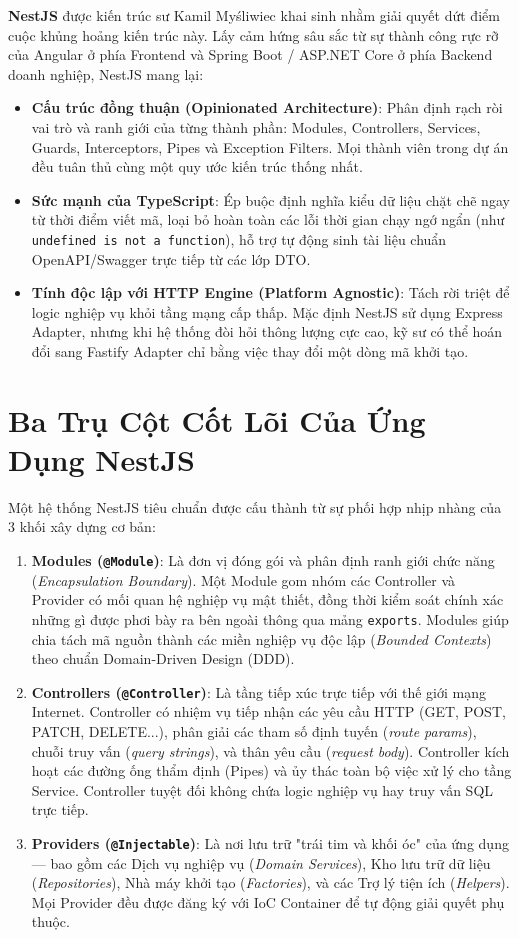 \documentclass[12pt,a4paper,oneside]{book}
\begin{document}
\textbf{NestJS} được kiến trúc sư Kamil Myśliwiec khai sinh nhằm giải quyết dứt điểm cuộc khủng hoảng kiến trúc này. Lấy cảm hứng sâu sắc từ sự thành công rực rỡ của Angular ở phía Frontend và Spring Boot / ASP.NET Core ở phía Backend doanh nghiệp, NestJS mang lại:
\begin{itemize}
  \item \textbf{Cấu trúc đồng thuận (Opinionated Architecture)}: Phân định rạch ròi vai trò và ranh giới của từng thành phần: Modules, Controllers, Services, Guards, Interceptors, Pipes và Exception Filters. Mọi thành viên trong dự án đều tuân thủ cùng một quy ước kiến trúc thống nhất.
  \item \textbf{Sức mạnh của TypeScript}: Ép buộc định nghĩa kiểu dữ liệu chặt chẽ ngay từ thời điểm viết mã, loại bỏ hoàn toàn các lỗi thời gian chạy ngớ ngẩn (như \texttt{undefined is not a function}), hỗ trợ tự động sinh tài liệu chuẩn OpenAPI/Swagger trực tiếp từ các lớp DTO.
  \item \textbf{Tính độc lập với HTTP Engine (Platform Agnostic)}: Tách rời triệt để logic nghiệp vụ khỏi tầng mạng cấp thấp. Mặc định NestJS sử dụng Express Adapter, nhưng khi hệ thống đòi hỏi thông lượng cực cao, kỹ sư có thể hoán đổi sang Fastify Adapter chỉ bằng việc thay đổi một dòng mã khởi tạo.
\end{itemize}

\section{Ba Trụ Cột Cốt Lõi Của Ứng Dụng NestJS}
Một hệ thống NestJS tiêu chuẩn được cấu thành từ sự phối hợp nhịp nhàng của 3 khối xây dựng cơ bản:
\begin{enumerate}
  \item \textbf{Modules (\texttt{@Module})}: Là đơn vị đóng gói và phân định ranh giới chức năng (\textit{Encapsulation Boundary}). Một Module gom nhóm các Controller và Provider có mối quan hệ nghiệp vụ mật thiết, đồng thời kiểm soát chính xác những gì được phơi bày ra bên ngoài thông qua mảng \texttt{exports}. Modules giúp chia tách mã nguồn thành các miền nghiệp vụ độc lập (\textit{Bounded Contexts}) theo chuẩn Domain-Driven Design (DDD).
  \item \textbf{Controllers (\texttt{@Controller})}: Là tầng tiếp xúc trực tiếp với thế giới mạng Internet. Controller có nhiệm vụ tiếp nhận các yêu cầu HTTP (GET, POST, PATCH, DELETE...), phân giải các tham số định tuyến (\textit{route params}), chuỗi truy vấn (\textit{query strings}), và thân yêu cầu (\textit{request body}). Controller kích hoạt các đường ống thẩm định (Pipes) và ủy thác toàn bộ việc xử lý cho tầng Service. Controller tuyệt đối không chứa logic nghiệp vụ hay truy vấn SQL trực tiếp.
  \item \textbf{Providers (\texttt{@Injectable})}: Là nơi lưu trữ "trái tim và khối óc" của ứng dụng — bao gồm các Dịch vụ nghiệp vụ (\textit{Domain Services}), Kho lưu trữ dữ liệu (\textit{Repositories}), Nhà máy khởi tạo (\textit{Factories}), và các Trợ lý tiện ích (\textit{Helpers}). Mọi Provider đều được đăng ký với IoC Container để tự động giải quyết phụ thuộc.
\end{enumerate}
\end{document}

